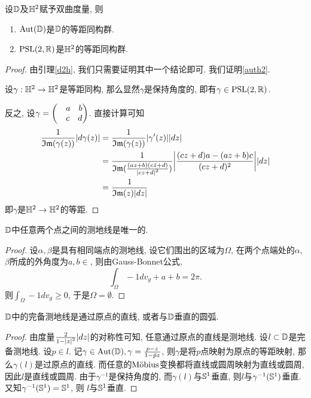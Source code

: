 \begin{theorem}
    设$\D$及$\HH$赋予双曲度量, 则
    \begin{enumerate}
        \item $\aut(\D)$是$\D$的等距同构群. 
        \item $\psl(2,\R)$是$\HH$的等距同构群.\label{auth2}
    \end{enumerate}
\end{theorem}
\begin{proof}
    由引理\eqref{d2h}, 我们只需要证明其中一个结论即可. 我们证明\eqref{auth2}. 
    \par 设$\gamma: \HH \to \HH$是等距同构, 那么显然$\gamma$是保持角度的, 即有$\gamma \in \psl(2,\R)$.
    \par 反之, 设$\gamma=\begin{pmatrix}
        &a \s b\\
        &c \s d
    \end{pmatrix}$.  直接计算可知
    \begin{equation}
        \begin{split}
            \rec{\Im(\gamma(z))}\abs{d\gamma(z)}&=\rec{\Im(\gamma(z))}\abs{\gamma'(z)}\abs{dz} \\
            &=\rec{\Im(\frac{(az+b)(c\bar{z}+d)}{\abs{cz+d}^2})} \abs{\frac{(cz+d)a-(az+b)c}{(cz+d)^2}} \abs{dz} \\
            &=\rec{\Im(z)\abs{dz}}
        \end{split}
    \end{equation}
    即$\gamma$是$\HH \to \HH$的等距.
\end{proof}
\begin{lemma}
    $\D$中任意两个点之间的测地线是唯一的.
\end{lemma}
\begin{proof}
    设$\alpha,\beta$是具有相同端点的测地线, 设它们围出的区域为$\Omega$, 在两个点端处的$\alpha$,$\beta$所成的外角度为$a,b \in $, 则由Gauss-Bonnet公式,
    \begin{equation}
        \int_\Omega -1dv_g+a+b=2\pi.
    \end{equation}
    则$\int_\Omega -1dv_g \ge 0$, 于是$\Omega =\emptyset$.
\end{proof}
\begin{theorem}
    $\D$中的完备测地线是通过原点的直线, 或者与$\D$垂直的圆弧.
\end{theorem}
\begin{proof}
    由度量$\frac{2}{1-\abs{z}^2}\abs{dz}$的对称性可知, 任意通过原点的直线是测地线. 设$l \subset \D$是完备测地线. 设$p\in l$. 记$\gamma\in \aut(\D), \gamma=\frac{p-z}{1-\bar{p}z}$, 则$\gamma$是将$p$点映射为原点的等距映射, 那么$\gamma(l)$是过原点的直线. 而任意的$\mobius$变换都将直线或圆周映射为直线或圆周, 因此$l$是直线或圆周. 由于$\gamma^{-1}$是保持角度的, 而$\gamma(l)$与$\S^1$垂直, 则$l$与$\gamma^{-1}(\S^1)$垂直. 又知$\gamma^{-1}(\S^1)=\S^1$, 则 $l$与$\S^1$垂直.
\end{proof}

